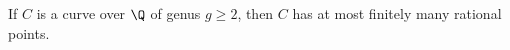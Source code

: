 \begin{frame}[plain]
\end{frame}





\begin{frame}[plain]
\begin{thm}
If $C$ is a curve over $\Q$ of genus $g \geq 2$, then $C$ has at most finitely many rational points. 
\end{thm}
\end{frame}





\begin{frame}[plain]
\end{frame}





